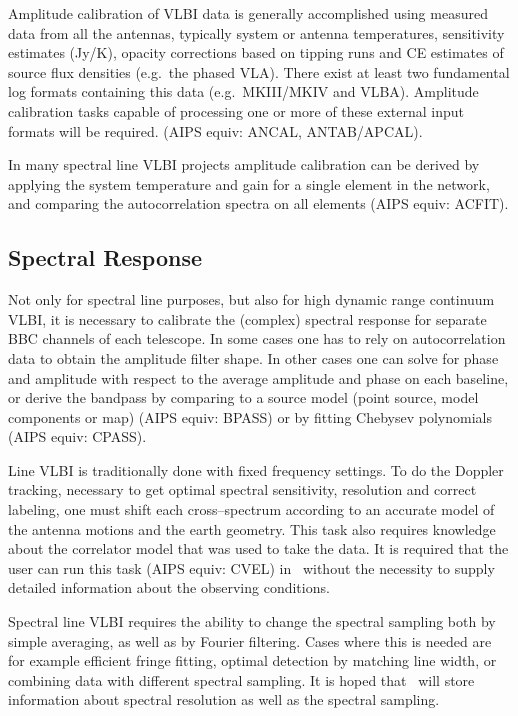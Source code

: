 Amplitude calibration of VLBI data is generally accomplished using
measured data from all the antennas, typically system or antenna
temperatures, sensitivity estimates (Jy\slash K), opacity corrections based
on tipping runs and CE estimates of source flux densities (e.g.\ the
phased VLA). There exist at least two fundamental log formats
containing this data (e.g.\ MKIII\slash MKIV and VLBA). Amplitude
calibration tasks capable of processing one or more of these external
input formats will be required. (AIPS equiv: ANCAL, ANTAB\slash APCAL).

In many spectral line VLBI projects amplitude calibration can be
derived by applying the system temperature and gain for a single
element in the network, and comparing the autocorrelation spectra on
all elements (AIPS equiv: ACFIT).

\subsection{Spectral Response}

Not only for spectral line purposes, but also for high dynamic range
continuum VLBI, it is necessary to calibrate the (complex) spectral
response for separate BBC channels of each telescope. In some cases
one has to rely on autocorrelation data to obtain the amplitude filter
shape. In other cases one can solve for phase and amplitude with
respect to the average amplitude and phase on each baseline, or derive
the bandpass by comparing to a source model (point source, model
components or map) (AIPS equiv: BPASS) or by fitting Chebysev
polynomials (AIPS equiv: CPASS).

Line VLBI is traditionally done with fixed frequency settings. To do
the Doppler tracking, necessary to get optimal spectral sensitivity,
resolution and correct labeling, one must shift each cross--spectrum
according to an accurate model of the antenna motions and the earth
geometry. This task also requires knowledge about the correlator model
that was used to take the data. It is required that the user can run
this task (AIPS equiv: CVEL) in \aipspp\ without the necessity to
supply detailed information about the observing conditions.

Spectral line VLBI requires the ability to change the spectral
sampling both by simple averaging, as well as by Fourier filtering.
Cases where this is needed are for example efficient fringe fitting,
optimal detection by matching line width, or combining data with
different spectral sampling. It is hoped that \aipspp\ will store
information about spectral resolution as well as the spectral
sampling.

